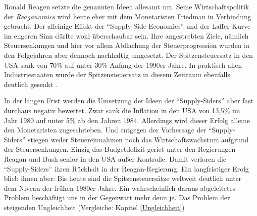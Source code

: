 Ronald Reagen setzte die genannten Ideen allesamt um. Seine Wirtschaftspolitik der \textit{Reaganomics} wird heute eher mit dem Monetaristen Friedman in Verbindung gebracht. Der alleinige Effekt der "`Supply-Side-Economics"' und der Laffer-Kurve im engeren Sinn dürfte wohl überschaubar sein. Ihre angestrebten Ziele, nämlich Steuersenkungen und hier vor allem Abflachung der Steuerprogression wurden in den Folgejahren aber dennoch nachhaltig umgesetzt. Der Spitzensteuersatz in den USA sank von 70\% auf unter 30\% Anfang der 1990er Jahre. In praktisch allen Industriestaaten wurde der Spitzensteuersatz in diesem Zeitraum ebenfalls deutlich gesenkt \parencite[S. 148]{Appelbaum2019}. 

In der langen Frist werden die Umsetzung der Ideen der "`Supply-Siders"' aber fast durchaus negativ bewertet. Zwar sank die Inflation in den USA von 13,5\% im Jahr 1980 auf unter 5\% ab den Jahren 1984. Allerdings wird dieser Erfolg alleine den Monetaristen zugeschrieben. Und entgegen der Vorhersage der "`Supply-Siders"' stiegen weder Steuereinnahmen noch das Wirtschaftswachstum  aufgrund der Steuersenkungen. Einzig das Budgetdefizit geriet unter den Regierungen Reagan und Bush senior in den USA außer Kontrolle. Damit verloren die "`Supply-Siders"' ihren Rückhalt in der Reagan-Regierung. Ein langfristiger Erolg blieb ihnen aber: Bis heute sind die Spitzensteuersätze weltweit deutlich unter dem Niveau der frühen 1980er Jahre. Ein wahrscheinlich daraus abgeleitetes Problem beschäftigt uns in der Gegenwart mehr denn je. Das Problem der steigenden Ungleichheit (Vergleiche: Kapitel \ref{Ungleichheit})

